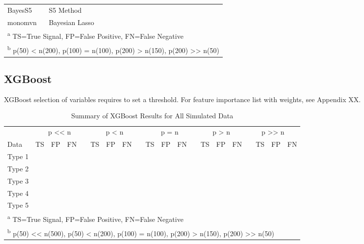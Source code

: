 \documentclass[
  11pt,
]{article}
\begin{document}
\begin{table}[!h]
\begin{tabular}[t]{>{}l|>{}l|>{}l|>{}l|>{}l|>{}l|>{}l|>{}l|>{}l|>{}l|>{}l|>{}l|>{}l|>{}l|>{}l|>{}l|>{}l|}
\hspace{1em}BayesS5 & S5 Method &  &  &  &  &  &  &  &  &  &  &  &  &  &  & \\
\hspace{1em}monomvn & Bayesian Lasso &  &  &  &  &  &  &  &  &  &  &  &  &  &  & \\
\bottomrule
\multicolumn{17}{l}{\textsuperscript{a} TS=True Signal, FP=False Positive, FN=False Negative}\\
\multicolumn{17}{l}{\textsuperscript{b} p(50) < n(200), p(100) = n(100), p(200) > n(150), p(200) >> n(50)}\\
\end{tabular}
\end{table}

\subsection{XGBoost}

XGBoost selection of variables requires to set a threshold. For feature
importance list with weights, see Appendix XX.

\begin{table}[!h]

\caption{\label{tab:Results XGBoost}Summary of XGBoost Results for All Simulated Data}
\centering
\fontsize{8.5}{10.5}\selectfont
\begin{tabular}[t]{>{}l|>{}l|>{}l|>{}l|>{}l|>{}l|>{}l|>{}l|>{}l|>{}l|>{}l|>{}l|>{}l|>{}l|>{}l|>{}l|>{}l|>{}l|>{}l|>{}l|}
\toprule
\multicolumn{1}{c}{ } & \multicolumn{4}{c}{p << n} & \multicolumn{4}{c}{p < n} & \multicolumn{4}{c}{p = n} & \multicolumn{3}{c}{p > n} & \multicolumn{4}{c}{p >> n} \\
\cmidrule(l{3pt}r{3pt}){2-5} \cmidrule(l{3pt}r{3pt}){6-9} \cmidrule(l{3pt}r{3pt}){10-13} \cmidrule(l{3pt}r{3pt}){14-16} \cmidrule(l{3pt}r{3pt}){17-20}
Data & TS & FP & FN &  & TS & FP & FN &  & TS & FP & FN &  & TS & FP & FN &  & TS & FP & FN\\
\midrule
Type 1 &  &  &  &  &  &  &  &  &  &  &  &  &  &  &  &  &  &  & \\
Type 2 &  &  &  &  &  &  &  &  &  &  &  &  &  &  &  &  &  &  & \\
Type 3 &  &  &  &  &  &  &  &  &  &  &  &  &  &  &  &  &  &  & \\
Type 4 &  &  &  &  &  &  &  &  &  &  &  &  &  &  &  &  &  &  & \\
Type 5 &  &  &  &  &  &  &  &  &  &  &  &  &  &  &  &  &  &  & \\
\bottomrule
\multicolumn{20}{l}{\textsuperscript{a} TS=True Signal, FP=False Positive, FN=False Negative}\\
\multicolumn{20}{l}{\textsuperscript{b} p(50) << n(500), p(50) < n(200), p(100) = n(100), p(200) > n(150), p(200) >> n(50)}\\
\end{tabular}
\end{table}
\end{document}
